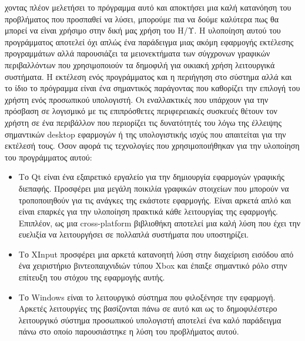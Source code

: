 χοντας πλέον μελετήσει το πρόγραμμα αυτό και αποκτήσει μια καλή κατανόηση του
προβλήματος που προσπαθεί να λύσει, μπορούμε πια να δούμε καλύτερα πως θα μπορεί
να είναι χρήσιμο στην δική μας χρήση του Η/Υ. Η υλοποίηση αυτού του προγράμματος
αποτελεί όχι απλώς ένα παράδειγμα μιας ακόμη εφαρμογής εκτέλεσης προγραμμάτων αλλά
παρουσιάζει τα μειονεκτήματα των σύγχρονων γραφικών περιβαλλόντων που χρησιμοποιούν
τα δημοφιλή για οικιακή χρήση λειτουργικά συστήματα. Η εκτέλεση ενός προγράμματος
και η περιήγηση στο σύστημα αλλά και το ίδιο το πρόγραμμα είναι ένα σημαντικός παράγοντας
που καθορίζει την επιλογή του χρήστη ενός προσωπικού υπολογιστή. Οι εναλλακτικές που
υπάρχουν για την πρόσβαση σε λογισμικό με τις επιπρόσθετες περιφερειακές συσκευές
θέτουν τον χρήστη σε ένα περιβάλλον που περιορίζει τις δυνατότητές του λόγω της έλλειψης
σημαντικών desktop εφαρμογών ή της υπολογιστικής ισχύς που απαιτείται για την εκτέλεσή τους.
Όσον αφορά τις τεχνολογίες που χρησιμοποιήθηκαν για την υλοποίηση του προγράμματος αυτού:
\begin{itemize}
	\item
Το Qt είναι ένα εξαιρετικό εργαλείο για την δημιουργία εφαρμογών γραφικής διεπαφής. Προσφέρει
μια μεγάλη ποικιλία γραφικών στοιχείων που μπορούν να τροποποιηθούν για τις ανάγκες της εκάστοτε
εφαρμογής. Είναι αρκετά απλό και είναι επαρκές για την υλοποίηση πρακτικά κάθε λειτουργίας της
εφαρμογής. Επιπλέον, ως μια cross-platform βιβλιοθήκη αποτελεί μια καλή λύση που έχει την ευελιξία
να λειτουργήσει σε πολλαπλά συστήματα που υποστηρίζει.
	\item
Το XInput προσφέρει μια αρκετά κατανοητή λύση στην διαχείριση εισόδου από ένα χειριστήριο βιντεοπαιχνιδιών
τύπου Xbox και έπαιξε σημαντικό ρόλο στην επίτευξη του στόχου της εφαρμογής αυτής.
	\item
Το Windows είναι το λειτουργικό σύστημα που φιλοξένησε την εφαρμογή. Αρκετές λειτουργίες της βασίζονται πάνω
σε αυτό και ως το δημοφιλέστερο λειτουργικό σύστημα προσωπικού υπολογιστή αποτελεί ένα καλό παράδειγμα πάνω
στο οποίο παρουσιάστηκε η λύση του προβλήματος αυτού.
\end{itemize} 

 

